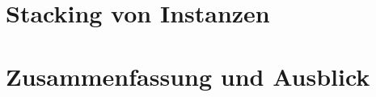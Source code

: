 \documentclass[ngerman, a4paper, 12pt, oneside]{article}
\numberwithin{equation}{section} %
\begin{document}
\section{Stacking von Instanzen}
	
\clearpage

\section{Zusammenfassung und Ausblick}
	
\clearpage

\newpage
{}
\renewcommand\refname{Quellen} %
{ %
}

\newpage
{}
{}
\listoffigures

\newpage
{}
{}
\listoftables
\end{document}
